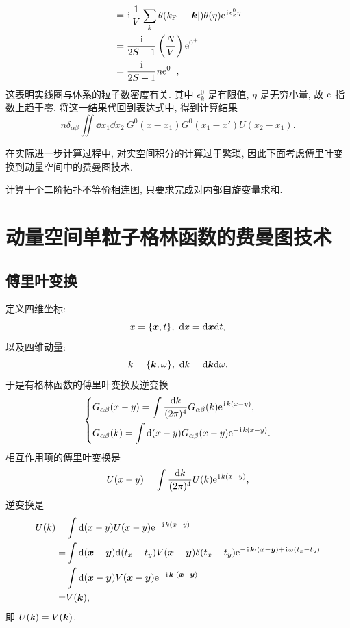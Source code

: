 \begin{example}
\begin{align}
            &=\hspace{0.1em}\mathrm{i}\hspace{0.1em}\frac{1}{V}\sum_k\theta(k_{\mathrm{F}}-|\boldsymbol{k}|)\theta(\eta)\mathrm{e}^{\hspace{0.1em}\mathrm{i}\hspace{0.1em}\epsilon_k^0\eta}\nonumber\\
            &=\frac{\hspace{0.1em}\mathrm{i}\hspace{0.1em}}{2S+1}\left( \frac{N}{V} \right)\mathrm{e}^{0^+}\nonumber\\
            &=\frac{\hspace{0.1em}\mathrm{i}\hspace{0.1em}}{2S+1}n\mathrm{e}^{0^+},
        \end{align}
    这表明实线圈与体系的粒子数密度有关. 其中 $\epsilon_k^0$ 是有限值, $\eta$ 是无穷小量, 故 $\mathrm{e}$ 指数上趋于零. 将这一结果代回到表达式中, 得到计算结果
    \begin{equation}
        n\delta_{\alpha\beta}\iint\dd x_1\dd x_2\ G^0(x-x_1)G^0(x_1-x')U(x_2-x_1).
    \end{equation}
\end{example}
在实际进一步计算过程中, 对实空间积分的计算过于繁琐, 因此下面考虑傅里叶变换到动量空间中的费曼图技术.
\begin{question}{}{}
    计算十个二阶拓扑不等价相连图, 只要求完成对内部自旋变量求和.
\end{question}
\section{动量空间单粒子格林函数的费曼图技术}
\subsection{傅里叶变换}
定义四维坐标:
\begin{equation}
    x=\{\boldsymbol{x},t\},\ \mathrm{d} x=\mathrm{d}\boldsymbol{x} \mathrm{d} t,
\end{equation}
以及四维动量:
\begin{equation}
    k=\{\boldsymbol{k},\omega\},\ \mathrm{d} k=\mathrm{d} \boldsymbol{k}\mathrm{d} \omega.
\end{equation}
于是有格林函数的傅里叶变换及逆变换
\begin{equation}
    \left\{\begin{aligned}
        &G_{\alpha\beta}(x-y)=\int\frac{\mathrm{d} k}{(2\pi)^4}G_{\alpha\beta}(k)\mathrm{e}^{\hspace{0.1em}\mathrm{i}\hspace{0.1em} k(x-y)},\\
        &G_{\alpha\beta}(k)=\int\mathrm{d}(x-y) G_{\alpha\beta}(x-y)\mathrm{e}^{-\hspace{0.1em}\mathrm{i}\hspace{0.1em} k(x-y)}.
    \end{aligned}\right.
\end{equation}
相互作用项的傅里叶变换是 
\begin{equation}
    U(x-y)=\int \frac{\mathrm{d} k}{(2\pi)^4}U(k)\mathrm{e}^{\hspace{0.1em}\mathrm{i}\hspace{0.1em} k(x-y)},
\end{equation}
逆变换是 
 \begin{align}
        U(k)=&\int\mathrm{d} (x-y)U(x-y) \mathrm{e}^{-\hspace{0.1em}\mathrm{i}\hspace{0.1em} k(x-y)}\nonumber\\
        =&\int\mathrm{d}(\boldsymbol{x}-\boldsymbol{y})\mathrm{d}(t_x-t_y)V(\boldsymbol{x}-\boldsymbol{y})\delta(t_x-t_y)\mathrm{e}^{-\hspace{0.1em}\mathrm{i}\hspace{0.1em} \boldsymbol{k}\cdot (\boldsymbol{x}-\boldsymbol{y})+\hspace{0.1em}\mathrm{i}\hspace{0.1em}\omega(t_x-t_y)}\nonumber\\
        =&\int\mathrm{d} (\boldsymbol{x}-\boldsymbol{y})V(\boldsymbol{x}-\boldsymbol{y})\mathrm{e}^{-\hspace{0.1em}\mathrm{i}\hspace{0.1em}\boldsymbol{k}\cdot(\boldsymbol{x}-\boldsymbol{y})}\nonumber\\
        =&V(\boldsymbol{k}),
    \end{align}
即 $U(k)=V(\boldsymbol{k})$.

